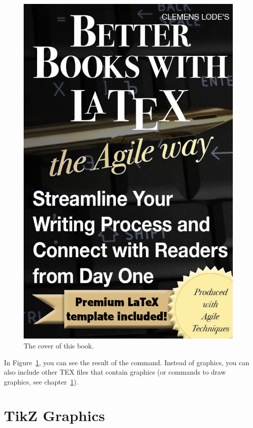 \begin{figure}[!ht]
	\centering
	\includegraphics{images/cover.jpg}
	\caption{The cover of this book.} \label{c1_cover:fig}
\end{figure}

In Figure~\ref{c1_cover:fig}, you can see the result of the command. Instead of graphics, you can also include other TEX files that contain graphics (or commands to draw graphics, see chapter~\ref{c1_tikzgraphics:sec}).


\section{TikZ Graphics}\label{c1_tikzgraphics:sec}

